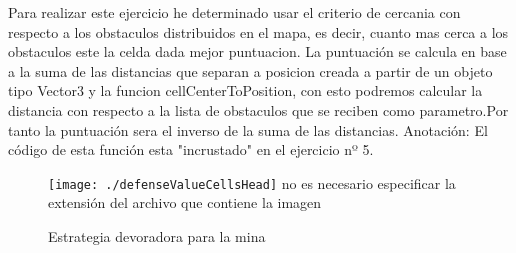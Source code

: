 Para realizar este ejercicio he determinado usar el criterio de cercania con respecto a los 
obstaculos distribuidos en el mapa, es decir, cuanto mas cerca a los obstaculos
este la celda dada mejor puntuacion.
La puntuación se calcula en base a la suma de las distancias que separan a posicion creada a partir 
de un objeto tipo Vector3 y la funcion cellCenterToPosition, con esto podremos calcular la distancia
con respecto a la lista de obstaculos que se reciben como parametro.Por tanto la puntuación sera
el inverso de la suma de las distancias.
Anotación: El código de esta función esta "incrustado" en el ejercicio nº 5.

\begin{figure}
\centering
\texttt{[image: ./defenseValueCellsHead]} 
 no es necesario especificar la extensión del archivo que contiene la imagen
\caption{Estrategia devoradora para la mina}
\label{fig:defenseValueCellsHead}
\end{figure}